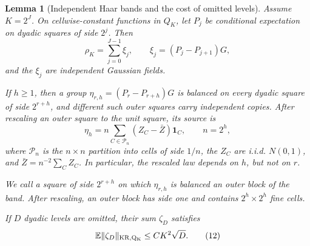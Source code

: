 \documentclass{aomart}
\newtheorem{lemma}[theorem]{Lemma}
\theoremstyle{definition}
\newcommand{\1}{\mathbf 1}
\begin{document}
\begin{lemma}[Independent Haar bands and the cost of omitted levels]\label{lem:dyadic-bands}
Assume $K=2^J$. On cellwise-constant functions in $Q_ K$, let $P_ j$
be conditional expectation on dyadic squares of side $2^j$. Then
\begin{equation}
\rho_ K=\sum_ {j=0}^{J-1}\xi_ j,
\qquad \xi_ j=(P_ j-P_ {j+1})G,
\tag{10}
\end{equation}
and the $\xi_ j$ are independent Gaussian fields.

If $h\geq1$, then a group
$\eta_ {r,h}=(P_ r-P_ {r+h})G$ is balanced on every dyadic square of side
$2^{r+h}$, and different such outer squares carry independent copies.
After rescaling an outer square to the unit square, its source is
\begin{equation}
\eta_ h=n\sum_ {C\in\mathcal P_ n}(Z_ C-\bar Z)\mathbf1_ C,
\qquad n=2^h,
\tag{11}
\end{equation}
where $\mathcal P_ n$ is the $n\times n$ partition into cells of side
$1/n$, the $Z_ C$ are i.i.d. $N(0,1)$, and
$\bar Z=n^{-2}\sum_ CZ_ C$. In particular, the rescaled law depends on
$h$, but not on $r$.

We call a square of side $2^{r+h}$ on which $\eta_{r,h}$ is balanced an
\emph{outer block} of the band.  After rescaling, an outer block has side
one and contains $2^h\times2^h$ fine cells.

If $D$ dyadic levels are omitted, their sum $\zeta_ D$ satisfies
\begin{equation}
\mathbb E\|\zeta_ D\|_ {\rm KR,Q_ K}\leq CK^2\sqrt D.
\tag{12}
\end{equation}

\end{lemma}
\end{document}
